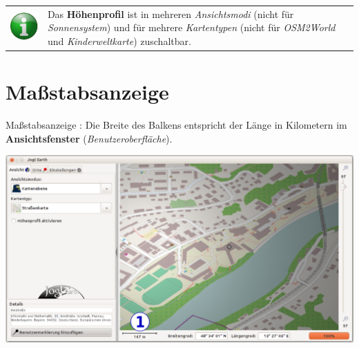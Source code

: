 \documentclass[10pt]{scrreprt}
\newcommand{\textref}[1]{\mbox{\raisebox{0.1ex}{\small$\rightarrow$ }\textit{#1}}}
\begin{document}
\vspace{3mm}
\begin{tabular}{>{\centering \arraybackslash}m{1cm} m{14cm}}
\includegraphics[scale=0.5]{images/info.eps} & Das \textbf{Höhenprofil} ist in mehreren \textref{Ansichtsmodi} (nicht für \textref{Sonnensystem}) und für mehrere \textref{Kartentypen} (nicht für \textref{OSM2World} und \textref{Kinderweltkarte}) zuschaltbar. \\ 
\end{tabular} 




\newpage
\section{Maßstabsanzeige} 
Maßstabsanzeige : Die Breite des Balkens entspricht der Länge in Kilometern im \textbf{Ansichtsfenster} (\textref{Benutzeroberfläche}).

\vspace{3mm}
\begin{center}
\includegraphics[scale=0.31]{images/flacheKarte_massstab.png}
\end{center}




\vspace{3mm}
\end{document}
